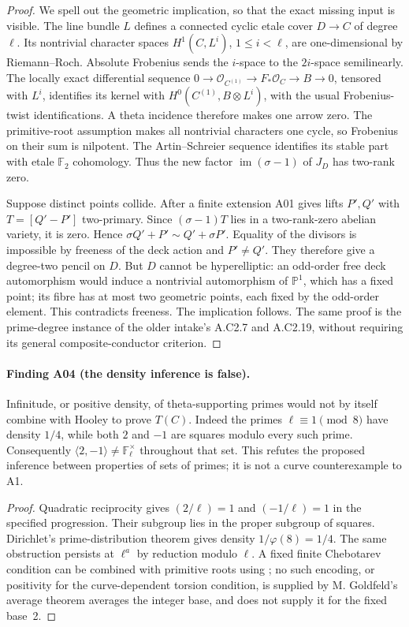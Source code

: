 \documentclass[11pt,a4paper]{article}
\begin{document}
\begin{proof}
We spell out the geometric implication, so that the exact missing input
is visible. The line bundle $L$ defines a connected cyclic etale cover
$D\to C$ of degree $\ell$. Its nontrivial character spaces
$H^1(C,L^i)$, $1\le i<\ell$, are one-dimensional by Riemann--Roch.
Absolute Frobenius sends the $i$-space to the $2i$-space semilinearly.
The locally exact differential sequence
$0\to\mathcal O_{C^{(1)}}\to F_*\mathcal O_C\to B\to0$,
tensored with $L^i$, identifies its kernel with
$H^0(C^{(1)},B\otimes L^i)$, with the usual Frobenius-twist
identifications. A theta incidence therefore makes one arrow zero.
The primitive-root assumption makes all nontrivial characters one
cycle, so Frobenius on their sum is nilpotent. The Artin--Schreier
sequence identifies its stable part with etale $\mathbb F_2$
cohomology. Thus the new factor $\operatorname{im}(\sigma-1)$ of
$J_D$ has two-rank zero.

Suppose distinct points collide. After a finite extension A01 gives
lifts $P',Q'$ with $T=[Q'-P']$ two-primary. Since
$(\sigma-1)T$ lies in a two-rank-zero abelian variety, it is zero.
Hence $\sigma Q'+P'\sim Q'+\sigma P'$. Equality of the divisors
is impossible by freeness of the deck action and $P'\ne Q'$.
They therefore give a degree-two pencil on $D$. But $D$ cannot be
hyperelliptic: an odd-order free deck automorphism would induce a
nontrivial automorphism of $\mathbb P^1$, which has a fixed point;
its fibre has at most two geometric points, each fixed by the
odd-order element. This contradicts freeness. The implication follows.
The same proof is the prime-degree instance of the older intake's
A.C2.7 and A.C2.19, without requiring its general composite-conductor
criterion.
\end{proof}

\paragraph{Finding A04 (the density inference is false).}
Infinitude, or positive density, of theta-supporting primes would not
by itself combine with Hooley to prove $T(C)$. Indeed the primes
$\ell\equiv1\pmod8$ have density $1/4$, while both $2$ and $-1$
are squares modulo every such prime. Consequently
$\langle2,-1\rangle\ne\mathbb F_\ell^\times$ throughout that set.
This refutes the proposed inference between properties of sets of
primes; it is not a curve counterexample to A1.

\begin{proof}
Quadratic reciprocity gives $(2/\ell)=1$ and $(-1/\ell)=1$ in the
specified progression. Their subgroup lies in the proper subgroup
of squares. Dirichlet's prime-distribution theorem gives density
$1/\varphi(8)=1/4$. The same obstruction persists at $\ell^a$ by
reduction modulo $\ell$. A fixed finite Chebotarev condition can be
combined with primitive roots using \cite[Theorem~3.1, and
Theorems~4.1--4.2 for positivity]{Lenstra1977}; no such encoding,
or positivity for the curve-dependent torsion condition, is supplied
by M. Goldfeld's average theorem \cite[Theorem, p.~223]{Goldfeld}
averages the integer base, and does not supply it for the fixed base~2.
\end{proof}
\end{document}
